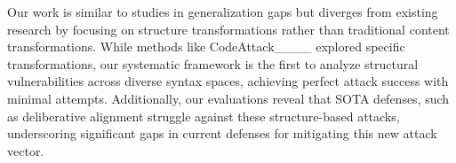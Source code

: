 Our work is similar to studies in generalization gaps but diverges from existing research by focusing on structure transformations rather than traditional content transformations. While methods like CodeAttack____ explored specific transformations, our systematic framework is the first to analyze structural vulnerabilities across diverse syntax spaces, achieving perfect attack success with minimal attempts. Additionally, our evaluations reveal that SOTA defenses, such as deliberative alignment struggle against these structure-based attacks, underscoring significant gaps in current defenses for mitigating this new attack vector.